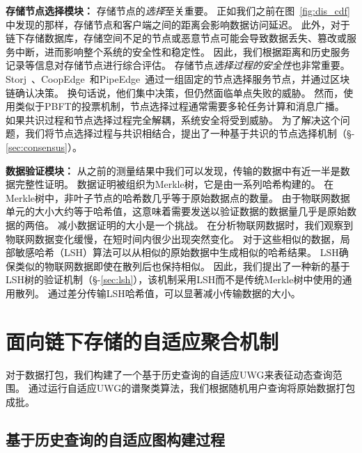 \textbf{存储节点选择模块：}
存储节点的\textit{选择}至关重要。
正如我们之前在图~\autoref{fig:dis_cdf}中发现的那样，存储节点和客户端之间的距离会影响数据访问延迟。
此外，对于链下存储数据库，存储空间不足的节点或恶意节点可能会导致数据丢失、篡改或服务中断，进而影响整个系统的安全性和稳定性。
因此，我们根据距离和历史服务记录等信息对存储节点进行综合评估。
存储节点\textit{选择过程的安全性}也非常重要。
Storj~\cite{storj2018storj}、CoopEdge~\cite{yuan2021coopedge}和PipeEdge~\cite{yuan2023pipeedge}通过一组固定的节点选择服务节点，并通过区块链确认决策。
换句话说，他们集中决策，但仍然面临单点失败的威胁。
然而，使用类似于PBFT的投票机制，节点选择过程通常需要多轮任务计算和消息广播。
如果共识过程和节点选择过程完全解耦，系统安全将受到威胁。
为了解决这个问题，我们将节点选择过程与共识相结合，提出了一种基于共识的节点选择机制（§-\ref{sec:consensus}）。

\textbf{数据验证模块：}
从之前的测量结果中我们可以发现，传输的数据中有近一半是数据完整性证明。
数据证明被组织为Merkle树，它是由一系列哈希构建的。
在Merkle树中，非叶子节点的哈希数几乎等于原始数据点的数量。
由于物联网数据单元的大小大约等于哈希值，这意味着需要发送以验证数据的数据量几乎是原始数据的两倍。
减小数据证明的大小是一个挑战。
在分析物联网数据时，我们观察到物联网数据变化缓慢，在短时间内很少出现突然变化。
对于这些相似的数据，局部敏感哈希（LSH）算法可以从相似的原始数据中生成相似的哈希结果。
LSH确保类似的物联网数据即使在散列后也保持相似。
因此，我们提出了一种新的基于LSH树的验证机制（§-\ref{sec:lsh}），该机制采用LSH而不是传统Merkle树中使用的通用散列。
通过差分传输LSH哈希值，可以显著减小传输数据的大小。

\chapter{面向链下存储的自适应聚合机制}
\label{sec:packaging}

对于数据打包，我们构建了一个基于历史查询的自适应UWG来表征动态查询范围。
通过运行自适应UWG的谱聚类算法，我们根据随机用户查询将原始数据打包成批。

\section{基于历史查询的自适应图构建过程}
\label{sec:UWG}

